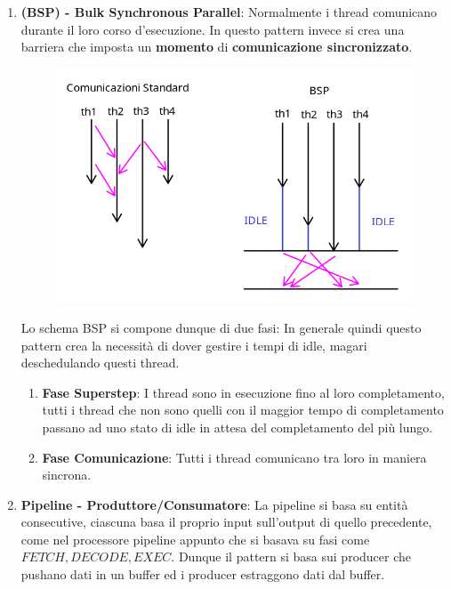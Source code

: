 \documentclass{article}
\begin{document}
\begin{enumerate}
    \item \textbf{(BSP) - Bulk Synchronous Parallel}: Normalmente i thread comunicano durante il loro corso d'esecuzione. In questo pattern invece si crea una barriera che imposta un \textbf{momento} di \textbf{comunicazione sincronizzato}.
    \begin{figure}[htbp]
        \center
        \includegraphics[scale=0.35]{img/BSP.png}
    \end{figure}
    Lo schema BSP si compone dunque di due fasi:
    In generale quindi questo pattern crea la necessità di dover gestire i tempi di idle, magari deschedulando questi thread.
    
    \begin{enumerate}
        \item \textbf{Fase Superstep}: I thread sono in esecuzione fino al loro completamento, tutti i thread che non sono quelli con il maggior tempo di completamento passano ad uno stato di idle in attesa del completamento del più lungo.
        \item \textbf{Fase Comunicazione}: Tutti i thread comunicano tra loro in maniera sincrona.
    \end{enumerate}
    \item \textbf{Pipeline - Produttore/Consumatore}: La pipeline si basa su entità consecutive, ciascuna basa il proprio input sull'output di quello precedente, come nel processore pipeline appunto che
    si basava su fasi come $FETCH, DECODE, EXEC$. Dunque il pattern si basa sui producer che pushano dati in un buffer ed i producer estraggono dati dal buffer.
\end{enumerate}
\end{document}
